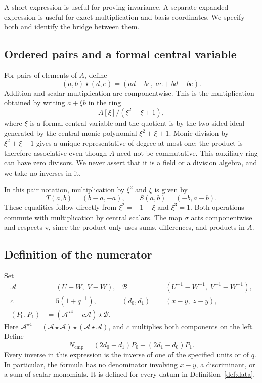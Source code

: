 \documentclass[11pt,letterpaper]{article}
\theoremstyle{definition}
\theoremstyle{remark}
\begin{document}
A short expression is useful for proving invariance. A separate expanded
expression is useful for exact multiplication and basis coordinates. We
specify both and identify the bridge between them.

\subsection{Ordered pairs and a formal central variable}

For pairs of elements of $A$, define
\begin{equation}\label{eq:pair-product}
(a,b)\star(d,e)=(ad-be,\;ae+bd-be).
\end{equation}
Addition and scalar multiplication are componentwise. This is the
multiplication obtained by writing $a+\xi b$ in the ring
\[
A[\xi]/(\xi^2+\xi+1),
\]
where $\xi$ is a formal central variable and the quotient is by the
two-sided ideal generated by the central monic polynomial
$\xi^2+\xi+1$. Monic division by
$\xi^2+\xi+1$ gives a unique representative of degree at most one; the
product is therefore associative even though $A$ need not be commutative.
This auxiliary ring can have zero divisors. We never assert that it is a
field or a division algebra, and we take no inverses in it.

In this pair notation, multiplication by $\xi^2$ and $\xi$ is given by
\begin{equation}\label{eq:TS}
T(a,b)=(b-a,-a),\qquad S(a,b)=(-b,a-b).
\end{equation}
These equalities follow directly from $\xi^2=-1-\xi$ and $\xi^3=1$.
Both operations commute with multiplication by central scalars. The map
$\sigma$ acts componentwise and respects $\star$, since the product only
uses sums, differences, and products in $A$.

\subsection{Definition of the numerator}

Set
\begin{align}
\mathcal A&=(U-W,\;V-W),&
\mathcal B&=(U^{-1}-W^{-1},\;V^{-1}-W^{-1}),\label{eq:AB}\\
c&=5(1+q^{-1}),&
(d_0,d_1)&=(x-y,\;z-y),\label{eq:cd}\\
(P_0,P_1)&=(\mathcal A^{\star4}-c\mathcal A)\star\mathcal B.
\label{eq:P}
\end{align}
Here $\mathcal A^{\star4}=(\mathcal A\star\mathcal A)\star
(\mathcal A\star\mathcal A)$, and $c$ multiplies both components on the
left. Define
\begin{equation}\label{eq:Ncompact}
N_{\mathrm{cmp}}=(2d_0-d_1)P_0+(2d_1-d_0)P_1.
\end{equation}
Every inverse in this expression is the inverse of one of the specified
units or of $q$. In particular, the formula has no denominator involving
$x-y$, a discriminant, or a sum of scalar monomials. It is defined for
every datum in Definition~\ref{def:data}.
\end{document}
